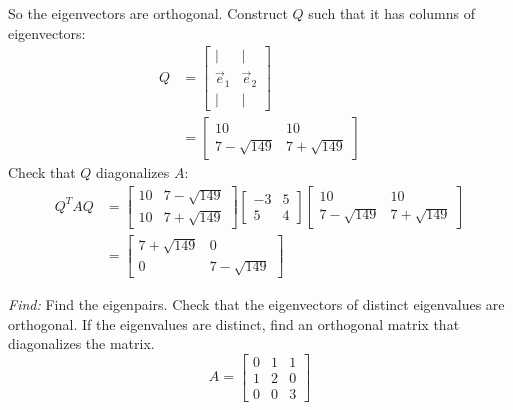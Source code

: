 \documentclass[11pt]{homework}
\begin{document}
So the eigenvectors are orthogonal.
Construct $Q$ such that it has
columns of eigenvectors:
\begin{align*}
Q &= 
  \begin{bmatrix}
  | & | \\
  \vec e_1 & \vec e_2 \\
  | & | 
  \end{bmatrix}\\
  &=
  \begin{bmatrix}
  10             & 10 \\
  7 - \sqrt{149} & 7 + \sqrt{149}
  \end{bmatrix}
\end{align*}
Check that $Q$ diagonalizes $A$:
\begin{align*}
Q^T A Q &=
  \begin{bmatrix}
  10 & 7 - \sqrt{149}\\
  10 & 7 + \sqrt{149}
  \end{bmatrix}
  \begin{bmatrix}
  -3 & 5 \\
  5 & 4
  \end{bmatrix}
  \begin{bmatrix}
  10             & 10 \\
  7 - \sqrt{149} & 7 + \sqrt{149}
  \end{bmatrix} \\
  &=
  \begin{bmatrix}
  7 + \sqrt{149} & 0 \\
  0 & 7 - \sqrt{149}
  \end{bmatrix}
\end{align*}

\question
\emph{Find:}
\newline
Find the eigenpairs.
Check that the eigenvectors of distinct eigenvalues are orthogonal.
If the eigenvalues are distinct, find an orthogonal matrix that diagonalizes the matrix.
\begin{equation*}
A = 
  \begin{bmatrix}
  0 & 1 & 1 \\
  1 & 2 & 0 \\
  0 & 0 & 3
  \end{bmatrix}
\end{equation*}
\end{document}
